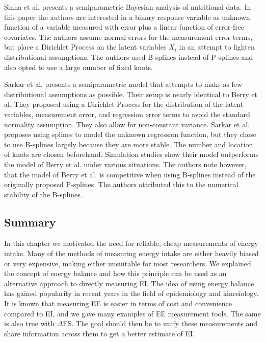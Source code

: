 \documentclass[11pt]{article}\usepackage[]{graphicx}\usepackage[]{color}
\begin{document}
Sinha et al. \cite{sinha10} presents a semiparametric Bayesian analysis of nutritional data. In this paper the authors are interested in a binary response variable as unknown function of a variable measured with error plus a linear function of error-free covariates. The authors assume normal errors for the measurement error terms, but place a Dirichlet Process on the latent variables $X_i$ in an attempt to lighten distributional assumptions. The authors used B-splines instead of P-splines and also opted to use a large number of fixed knots. 


Sarkar et al. \cite{sarkar14} presents a semiparametric model that attempts to make as few distributional assumptions as possible. Their setup is nearly identical to Berry et al. They proposed using a Dirichlet Process for the distribution of the latent variables, measurement error, and regression error terms to avoid the standard normality assumption. They also allow for non-constant variance. Sarkar et al. proposes using splines to model the unknown regression function, but they chose to use B-splines largely because they are more stable. The number and location of knots are chosen beforehand. Simulation studies show their model outperforms the model of Berry et al. under various situations. The authors note however, that the model of Berry et al. is competitive when using B-splines instead of the originally proposed P-splines. The authors attributed this to the numerical stability of the B-splines.


\subsection{Summary}

In this chapter we motivated the need for reliable, cheap measurements of energy intake.  Many of the methods of measuring energy intake are either heavily biased or very expensive, making either unsuitable for most researchers.   We explained the concept of energy balance and how this principle can be used as an alternative approach to directly measuring EI. The idea of using energy balance has gained popularity in recent years in the field of epidemiology and kinesiology. It is known that measuring EE is easier in terms of cost and convenience compared to EI, and we gave many examples of EE measurement tools. The same is also true with $\Delta$ES. The goal should then be to unify these measurements and share information across them to get a better estimate of EI.
\end{document}
